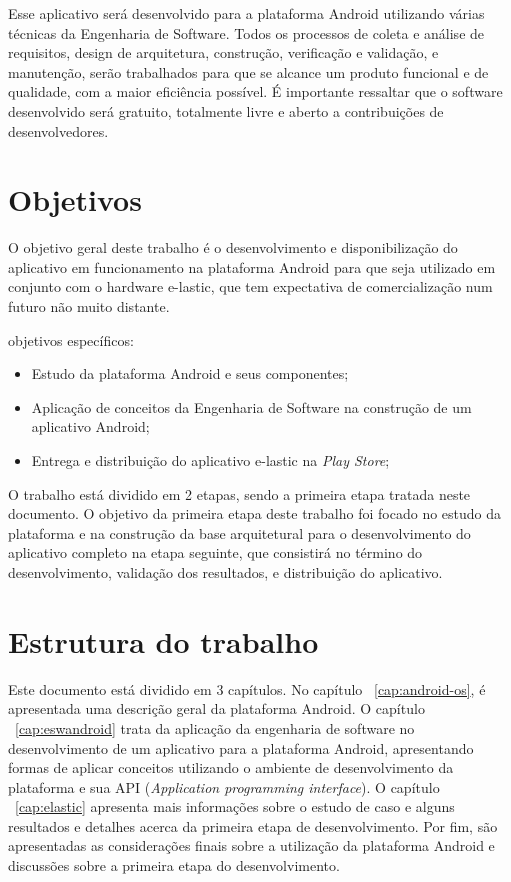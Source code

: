 Esse aplicativo será desenvolvido para a plataforma Android utilizando várias técnicas da Engenharia de Software. Todos os processos de coleta e análise de requisitos, design de arquitetura, construção, verificação e validação, e manutenção, serão trabalhados para que se alcance um produto funcional e de qualidade, com a maior eficiência possível. É importante ressaltar que o software desenvolvido será gratuito, totalmente livre e aberto a contribuições de desenvolvedores.
\section{Objetivos}
O objetivo geral deste trabalho é o desenvolvimento e disponibilização do aplicativo em funcionamento na plataforma Android para que seja utilizado em conjunto com o hardware e-lastic, que tem expectativa de comercialização num futuro não muito distante.

objetivos específicos:
\begin{itemize}
\item Estudo da plataforma Android e seus componentes;
\item Aplicação de conceitos da Engenharia de Software na construção de um aplicativo Android;
\item Entrega e distribuição do aplicativo e-lastic na \textit{Play Store};
\end{itemize}

O trabalho está dividido em 2 etapas, sendo a primeira etapa tratada neste documento. O objetivo da primeira etapa deste trabalho foi focado no estudo da plataforma e na construção da base arquitetural para o desenvolvimento do aplicativo completo na etapa seguinte, que consistirá no término do desenvolvimento, validação dos resultados, e distribuição do aplicativo.
\section{Estrutura do trabalho}
Este documento está dividido em 3 capítulos. No capítulo ~\ref{cap:android-os}, é apresentada uma descrição geral da plataforma Android. O capítulo ~\ref{cap:eswandroid} trata da aplicação da engenharia de software no desenvolvimento de um aplicativo para a plataforma Android, apresentando formas de aplicar conceitos utilizando o ambiente de desenvolvimento da plataforma e sua API (\textit{Application programming interface}). O capítulo ~\ref{cap:elastic} apresenta mais informações sobre o estudo de caso e alguns resultados e detalhes acerca da primeira etapa de desenvolvimento. Por fim, são apresentadas as considerações finais sobre a utilização da plataforma Android e discussões sobre a primeira etapa do desenvolvimento.